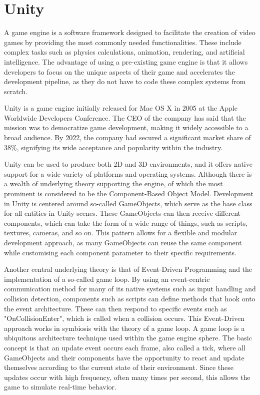 \section{Unity}

A game engine is a software framework designed to facilitate the creation of video games by providing the most commonly needed functionalities. These include complex tasks such as physics calculations, animation, rendering, and artificial intelligence. The advantage of using a pre-existing game engine is that it allows developers to focus on the unique aspects of their game and accelerates the development pipeline, as they do not have to code these complex systems from scratch.

Unity is a game engine initially released for Mac OS X in 2005 at the Apple Worldwide Developers Conference\cite{macworld2005}. The CEO of the company has said that the mission was to democratize game development, making it widely accessible to a broad audience\cite{polygon2014}. By 2022, the company had secured a significant market share of 38\%, signifying its wide acceptance and popularity within the industry\cite{slashdata2022}.

Unity can be used to produce both 2D and 3D environments, and it offers native support for a wide variety of platforms and operating systems. Although there is a wealth of underlying theory supporting the engine, of which the most prominent is considered to be the Component-Based Object Model. Development in Unity is centered around so-called GameObjects, which serve as the base class for all entities in Unity scenes. These GameObjects can then receive different components, which can take the form of a wide range of things, such as scripts, textures, cameras, and so on. This pattern allows for a flexible and modular development approach, as many GameObjects can reuse the same component while customising each component parameter to their specific requirements.

Another central underlying theory is that of Event-Driven Programming and the implementation of a so-called game loop\cite{gameprogrammingpatterns2023}. By using an event-centric communication method for many of its native systems such as input handling and collision detection, components such as scripts can define methods that hook onto the event architecture. These can then respond to specific events such as "OnCollisionEnter", which is called when a collision occurs\cite{unityManualExecutionOrder2023}\cite{unityManualEventFunctions2023}. This Event-Driven approach works in symbiosis with the theory of a game loop. A game loop is a ubiquitous architecture technique used within the game engine sphere. The basic concept is that an update event occurs each frame, also called a tick, where all GameObjects and their components have the opportunity to react and update themselves according to the current state of their environment. Since these updates occur with high frequency, often many times per second, this allows the game to simulate real-time behavior.

